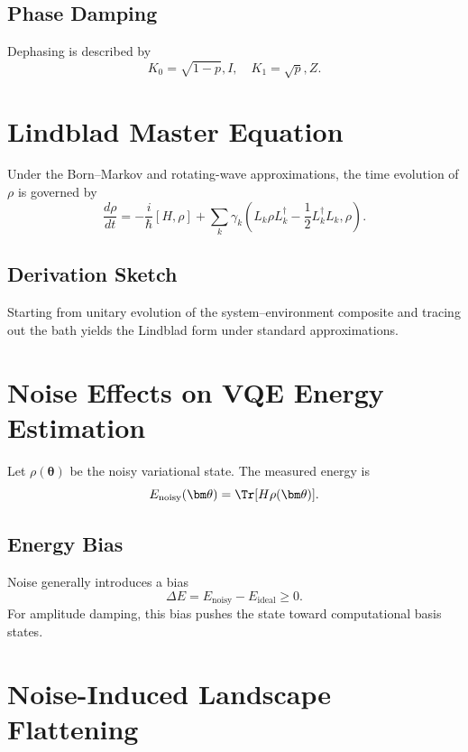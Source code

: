 \documentclass{book}
\begin{document}
\subsection{Phase Damping}

Dephasing is described by
\begin{equation}
K_0 = \sqrt{1-p},I, \quad K_1 = \sqrt{p},Z.
\end{equation}

\section{Lindblad Master Equation}

Under the Born–Markov and rotating-wave approximations, the time evolution of $\rho$ is governed by
\begin{equation}
\frac{d\rho}{dt} = -\frac{i}{\hbar}[H,\rho] + \sum_k \gamma_k \left(L_k \rho L_k^\dagger - \frac{1}{2}{L_k^\dagger L_k, \rho}\right).
\end{equation}

\subsection{Derivation Sketch}

Starting from unitary evolution of the system–environment composite and tracing out the bath yields the Lindblad form under standard approximations.

\section{Noise Effects on VQE Energy Estimation}

Let $\rho(\bm\theta)$ be the noisy variational state. The measured energy is
\begin{equation}
E_{\mathrm{noisy}}(\bm\theta) = \Tr[H \rho(\bm\theta)].
\end{equation}

\subsection{Energy Bias}

Noise generally introduces a bias
\begin{equation}
\Delta E = E_{\mathrm{noisy}} - E_{\mathrm{ideal}} \ge 0.
\end{equation}
For amplitude damping, this bias pushes the state toward computational basis states.

\section{Noise-Induced Landscape Flattening}
\end{document}
